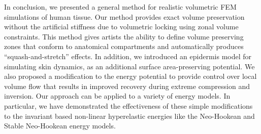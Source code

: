 In conclusion, we presented a general method for realistic volumetric FEM simulations of human tissue.
Our method provides exact volume preservation without the artificial stiffness due to volumetric
locking using zonal volume constraints. This method gives artists the ability to define volume
preserving zones that conform to anatomical compartments and automatically produces
``squash-and-stretch'' effects. In addition, we introduced an epidermis model for simulating
skin dynamics, as an additional surface area-preserving potential. We also proposed a
modification to the energy potential to provide control over local volume flow
that results in improved
recovery during extreme compression and inversion. Our approach can be applied to a variety of energy
models. In particular, we have demonstrated the effectiveness of these simple modifications to the
invariant based non-linear hyperelastic energies like the Neo-Hookean and Stable Neo-Hookean energy
models.
